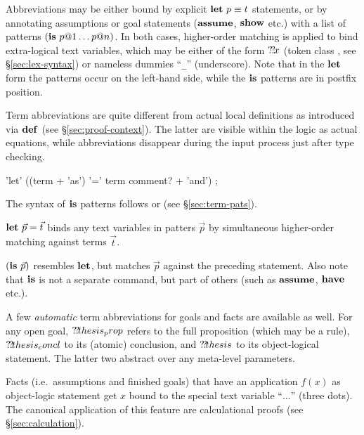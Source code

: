 Abbreviations may be either bound by explicit ${\mathord{\mathbf{let}}}~p \equiv t$ statements,
or by annotating assumptions or goal statements (${\mathord{\mathbf{assume}}}$, ${\mathord{\mathbf{show}}}$
etc.) with a list of patterns $({\mathord{\mathbf{is}}}~p@1 \dots p@n)$.  In both cases,
higher-order matching is applied to bind extra-logical text
variables, which may be either of the form ${?\!?\!x}$
(token class , see \S\ref{sec:lex-syntax}) or nameless
dummies ``\verb,_,'' (underscore). Note that in the
${\mathord{\mathbf{let}}}$ form the patterns occur on the left-hand side, while the ${\mathord{\mathbf{is}}}$
patterns are in postfix position.

Term abbreviations are quite different from actual local definitions as
introduced via ${\mathord{\mathbf{def}}}$ (see \S\ref{sec:proof-context}).  The latter are
visible within the logic as actual equations, while abbreviations disappear
during the input process just after type checking.

\begin{rail}
  'let' ((term + 'as') '=' term comment? + 'and')
  ;  
\end{rail}

The syntax of ${\mathord{\mathbf{is}}}$ patterns follows  or
 (see \S\ref{sec:term-pats}).

\begin{descr}
\item [${\mathord{\mathbf{let}}}~\vec p = \vec t$] binds any text variables in patters $\vec p$
  by simultaneous higher-order matching against terms $\vec t$.
\item [$({\mathord{\mathbf{is}}}~\vec p)$] resembles ${\mathord{\mathbf{let}}}$, but matches $\vec p$ against the
  preceding statement.  Also note that ${\mathord{\mathbf{is}}}$ is not a separate command,
  but part of others (such as ${\mathord{\mathbf{assume}}}$, ${\mathord{\mathbf{have}}}$ etc.).
\end{descr}

A few \emph{automatic} term abbreviations for
goals and facts are available as well.  For any open goal,
${?\!?\!thesis_prop}$ refers to the full proposition (which may be a rule),
${?\!?\!thesis_concl}$ to its (atomic) conclusion, and ${?\!?\!thesis}$ to its
object-logical statement.  The latter two abstract over any meta-level
parameters.

Facts (i.e.\ assumptions and finished goals) that have an application $f(x)$
as object-logic statement get $x$ bound to the special text variable
``$\dots$'' (three dots).  The canonical application of this feature are
calculational proofs (see \S\ref{sec:calculation}).


